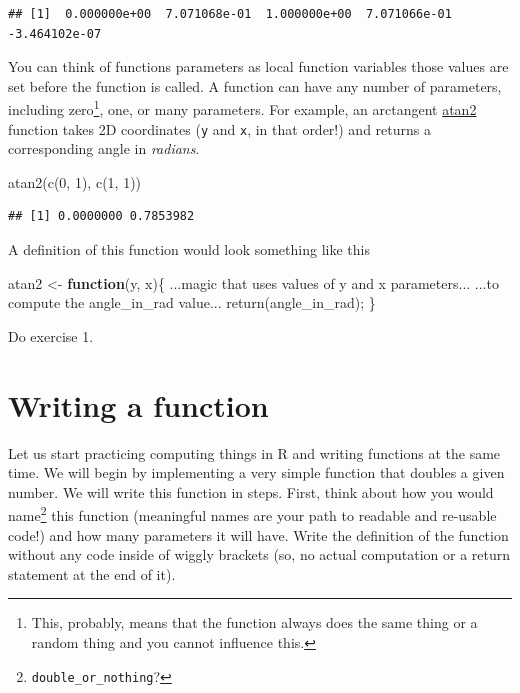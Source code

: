\documentclass[
]{book}
\newenvironment{Shaded}{\begin{snugshade}}{\end{snugshade}}
\newcommand{\ControlFlowTok}[1]{\textcolor[rgb]{0.13,0.29,0.53}{\textbf{#1}}}
\newcommand{\DecValTok}[1]{\textcolor[rgb]{0.00,0.00,0.81}{#1}}
\newcommand{\FunctionTok}[1]{\textcolor[rgb]{0.00,0.00,0.00}{#1}}
\newcommand{\NormalTok}[1]{#1}
\newcommand{\OtherTok}[1]{\textcolor[rgb]{0.56,0.35,0.01}{#1}}
\begin{document}
\begin{verbatim}
## [1]  0.000000e+00  7.071068e-01  1.000000e+00  7.071066e-01 -3.464102e-07
\end{verbatim}

You can think of functions parameters as local function variables those values are set before the function is called. A function can have any number of parameters, including zero\footnote{This, probably, means that the function always does the same thing or a random thing and you cannot influence this.}, one, or many parameters. For example, an arctangent \href{https://stat.ethz.ch/R-manual/R-devel/library/base/html/Trig.html}{atan2} function takes 2D coordinates (\texttt{y} and \texttt{x}, in that order!) and returns a corresponding angle in \emph{radians}.

\begin{Shaded}
\begin{Highlighting}[]
\FunctionTok{atan2}\NormalTok{(}\FunctionTok{c}\NormalTok{(}\DecValTok{0}\NormalTok{, }\DecValTok{1}\NormalTok{), }\FunctionTok{c}\NormalTok{(}\DecValTok{1}\NormalTok{, }\DecValTok{1}\NormalTok{))}
\end{Highlighting}
\end{Shaded}

\begin{verbatim}
## [1] 0.0000000 0.7853982
\end{verbatim}

A definition of this function would look something like this

\begin{Shaded}
\begin{Highlighting}[]
\NormalTok{atan2 }\OtherTok{\textless{}{-}} \ControlFlowTok{function}\NormalTok{(y, x)\{}
\NormalTok{  ...magic that uses values of y and x parameters...}
\NormalTok{  ...to compute the angle\_in\_rad value...}
  \FunctionTok{return}\NormalTok{(angle\_in\_rad);}
\NormalTok{\}}
\end{Highlighting}
\end{Shaded}

Do exercise 1.

\hypertarget{writing-a-function}{%
\section{Writing a function}\label{writing-a-function}}

Let us start practicing computing things in R and writing functions at the same time. We will begin by implementing a very simple function that doubles a given number. We will write this function in steps. First, think about how you would name\footnote{\texttt{double\_or\_nothing}?} this function (meaningful names are your path to readable and re-usable code!) and how many parameters it will have. Write the definition of the function without any code inside of wiggly brackets (so, no actual computation or a return statement at the end of it).
\end{document}
